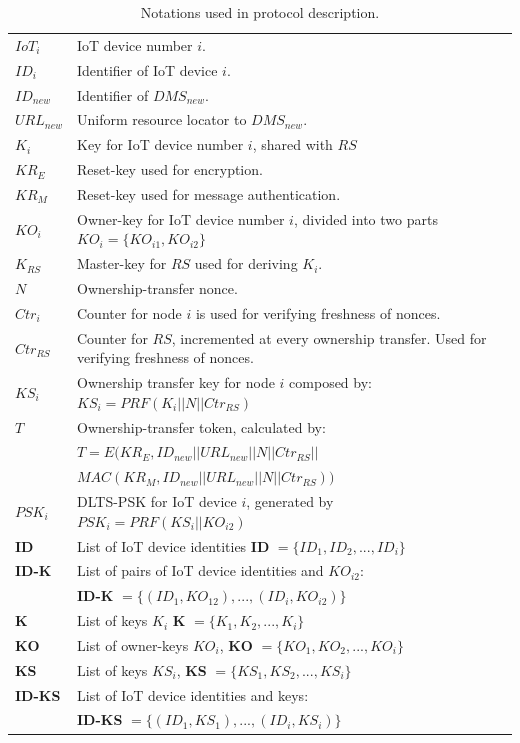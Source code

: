{\begin{table}
\begin{tabularx}{\textwidth}{l m{9cm}}
      $IoT_i$  & IoT device number $i$.  \\ 
      $ID_i$  & Identifier of IoT device $i$. \\
      $ID_{new}$ & Identifier of $DMS_{new}$.  \\ 
      $URL_{new}$ & Uniform resource locator to $DMS_{new}$.  \\ 
      $K_i$ & Key for IoT device number $i$, shared with $RS$  \\ 
      $KR_E$ & Reset-key used for encryption.  \\ 
      $KR_M$ & Reset-key used for message authentication.  \\
      $KO_i$ & Owner-key for IoT device number $i$, divided into two parts  $KO_i = \{KO_{i1}, KO_{i2}\}$  \\
      $K_{RS}$ & Master-key for $RS$ used for deriving $K_i$.  \\

      $N$ & Ownership-transfer nonce.  \\
      $Ctr_i$ & Counter for node $i$ is used for verifying freshness  of nonces.  \\
      $Ctr_{RS}$ & Counter for $RS$, incremented at every ownership transfer. Used for verifying freshness of nonces.\\
      $KS_i$ & Ownership transfer key for node $i$ composed by: $KS_i = PRF( K_i || N || Ctr_{RS})$ \\
       $T$ & Ownership-transfer token, calculated by:  \\
          & $T = E(KR_E, ID_{new} || URL_{new} || N || Ctr_{RS} ||$ \\
          &$ MAC(KR_M, ID_{new} || URL_{new} || N || Ctr_{RS} ))$  \\
      $PSK_i$ & DLTS-PSK for IoT device $i$, generated by $PSK_i = PRF(KS_i || KO_{i2})$ \\
      \textbf{ID} & List of IoT device identities \textbf{ID} $= \{ID_1, ID_2, ... , ID_i\}$ \\
      \textbf{ID-K} & List of pairs of  IoT device identities and $KO_{i2}$:  \\
                    &  \textbf{ID-K} $= \{(ID_1,KO_{12}),  ... , (ID_i, KO_{i2})\}$ \\
      \textbf{K} & List of keys $K_i$ \textbf{K} $= \{K_1, K_2, ... , K_i\}$ \\
      \textbf{KO} & List of owner-keys $KO_i$, \textbf{KO} $= \{KO_1, KO_2, ... , KO_i\}$ \\
      \textbf{KS} & List of keys $KS_i$, \textbf{KS} $= \{KS_1, KS_2, ... , KS_i\}$ \\
      \textbf{ID-KS} & List of IoT device identities and keys: \\
                     &  \textbf{ID-KS} $= \{(ID_1, KS_1), ... , (ID_i, KS_i)\}$ \\
          \hline
\end{tabularx}
\caption{Notations used in protocol description.}
\label{tab:notation}
\end{table}

}
